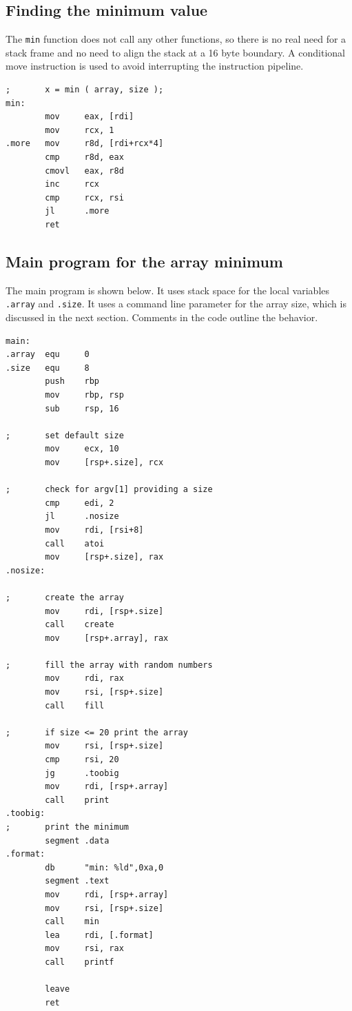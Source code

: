 \documentclass[11pt,b5paper]{book}
\begin{document}
\subsection{Finding the minimum value}

The {\tt min} function does not call any other functions, so there is no
real need for a stack frame and no need to align the stack at a 16 byte boundary.
A conditional move instruction is used to avoid interrupting the instruction
pipeline.

\begin{verbatim}
;       x = min ( array, size );
min:
        mov     eax, [rdi]
        mov     rcx, 1
.more   mov     r8d, [rdi+rcx*4]
        cmp     r8d, eax
        cmovl   eax, r8d
        inc     rcx
        cmp     rcx, rsi
        jl      .more
        ret
\end{verbatim}

\subsection{Main program for the array minimum}

The main program is shown below.
It uses stack space for the local variables {\tt .array} and {\tt .size}.
It uses a command line parameter for the array size, which is discussed
in the next section.
Comments in the code outline the behavior.

\begin{verbatim}
main:
.array  equ     0
.size   equ     8
        push    rbp
        mov     rbp, rsp
        sub     rsp, 16

;       set default size
        mov     ecx, 10
        mov     [rsp+.size], rcx

;       check for argv[1] providing a size
        cmp     edi, 2
        jl      .nosize
        mov     rdi, [rsi+8]
        call    atoi
        mov     [rsp+.size], rax
.nosize:

;       create the array
        mov     rdi, [rsp+.size]
        call    create
        mov     [rsp+.array], rax

;       fill the array with random numbers
        mov     rdi, rax
        mov     rsi, [rsp+.size]
        call    fill

;       if size <= 20 print the array
        mov     rsi, [rsp+.size]
        cmp     rsi, 20
        jg      .toobig
        mov     rdi, [rsp+.array]
        call    print
.toobig:
;       print the minimum
        segment .data
.format:
        db      "min: %ld",0xa,0
        segment .text
        mov     rdi, [rsp+.array]
        mov     rsi, [rsp+.size]
        call    min
        lea     rdi, [.format]
        mov     rsi, rax
        call    printf

        leave
        ret
\end{verbatim}
\end{document}
